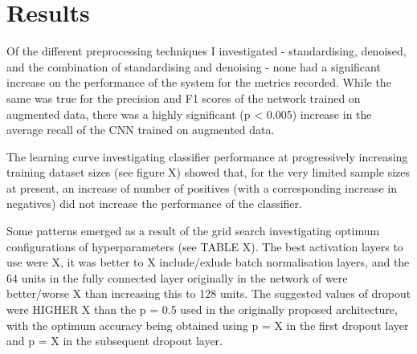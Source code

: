 \documentclass[11pt]{article}
\begin{document}
\section{Results}

Of the different preprocessing techniques I investigated - standardising, denoised, and the combination of standardising and denoising - none had a significant increase on the performance of the system for the metrics recorded. While the same was true for the precision and F1 scores of the network trained on augmented data, there was a highly significant (p < 0.005) increase in the average recall of the CNN trained on augmented data. 

The learning curve investigating classifier performance at progressively increasing training dataset sizes (see figure X) showed that, for the very limited sample sizes at present, an increase of number of positives (with a corresponding increase in negatives) did not increase the performance of the classifier.

Some patterns emerged as a result of the grid search investigating optimum configurations of hyperparameters (see TABLE X). The best activation layers to use were X, it was better to X include/exlude batch normalisation layers, and the 64 units in the fully connected layer originally in the network of \citep{salamon2017deep} were better/worse X than increasing this to 128 units. The suggested values of dropout were HIGHER X than the p = 0.5 used in the originally proposed architecture, with the optimum accuracy being obtained using p = X in the first dropout layer and p = X in the subsequent dropout layer.
\end{document}
